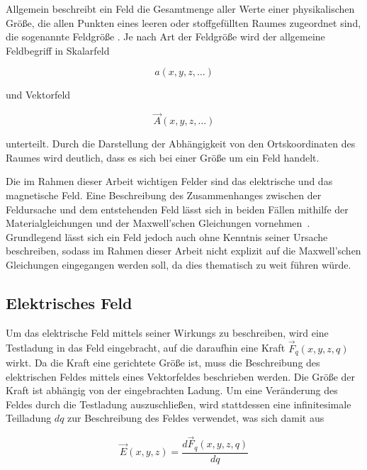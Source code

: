 
Allgemein beschreibt ein Feld die Gesamtmenge aller Werte einer physikalischen Größe, die allen Punkten eines leeren oder stoffgefüllten Raumes zugeordnet sind, die sogenannte Feldgröße \cite{Spektrum.de_Feld}. Je nach Art der Feldgröße wird der allgemeine Feldbegriff in Skalarfeld 

\begin{equation}
    a(x,y,z, \ldots)    
\end{equation}


und Vektorfeld 

\begin{equation}
    \vec A(x,y,z,\ldots)
\end{equation}

unterteilt. Durch die Darstellung der Abhängigkeit von den Ortskoordinaten des Raumes wird deutlich, dass es sich bei einer Größe um ein Feld handelt. \par
\vspace{\linespace}
Die im Rahmen dieser Arbeit wichtigen Felder sind das elektrische und das magnetische Feld. Eine Beschreibung des Zusammenhanges zwischen der Feldursache und dem entstehenden Feld lässt sich in beiden Fällen mithilfe der Materialgleichungen und der Maxwell'schen Gleichungen vornehmen~\cite{EM_Schirmung}. Grundlegend lässt sich ein Feld jedoch auch ohne Kenntnis seiner Ursache beschreiben, sodass im Rahmen dieser Arbeit nicht explizit auf die Maxwell'schen Gleichungen eingegangen werden soll, da dies thematisch zu weit führen würde. 


\subsection{Elektrisches Feld}\label{cha:2_sub_Elektrisches_Feld}

Um das elektrische Feld mittels seiner Wirkungs zu beschreiben, wird eine Testladung in das Feld eingebracht, auf die daraufhin eine Kraft $\vec F_q(x,y,z,q)$ wirkt. Da die Kraft eine gerichtete Größe ist, muss die Beschreibung des elektrischen Feldes mittels eines Vektorfeldes beschrieben werden. Die Größe der Kraft ist abhängig von der eingebrachten Ladung. Um eine Veränderung des Feldes durch die Testladung auszuschließen, wird stattdessen eine infinitesimale Teilladung $dq$ zur Beschreibung des Feldes verwendet, was sich damit aus

\begin{equation}
    \vec E (x,y,z) = \frac{d\vec F_q(x,y,z,q)}{dq}
\end{equation}

